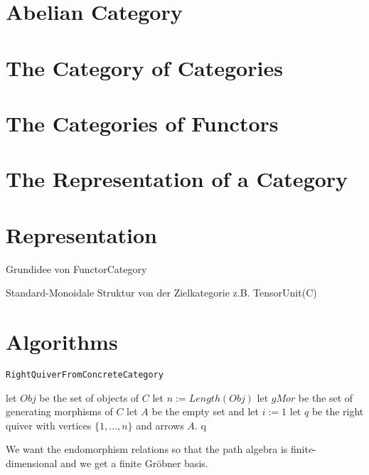 \documentclass{article}
\theoremstyle{definition}
\begin{document}
\section{Abelian Category}

\section{The Category of Categories}

\section{The Categories of Functors}

\section{The Representation of a Category}

\section{Representation}

Grundidee von FunctorCategory

Standard-Monoidale Struktur von der Zielkategorie z.B. TensorUnit(C)

\section{Algorithms}

\begin{algorithm}\capstart
    \caption{\texttt{RightQuiverFromConcreteCategory}}\label{algo:RightQuiverFromConcreteCategory}
	\BlankLine
	let $Obj$ be the set of objects of $C$\;
	let $n := Length(Obj)$\;
	let $gMor$ be the set of generating morphisms of $C$\;
	let $A$ be the empty set and let $i := 1$\;
	\BlankLine
	let $q$ be the right quiver with vertices $\{1,\dots,n\}$ and arrows $A$.
	\BlankLine
	\Return q\;
\end{algorithm}

We want the endomorphism relations so that the path algebra is finite-dimensional and we
get a finite Gröbner basis.
\end{document}
